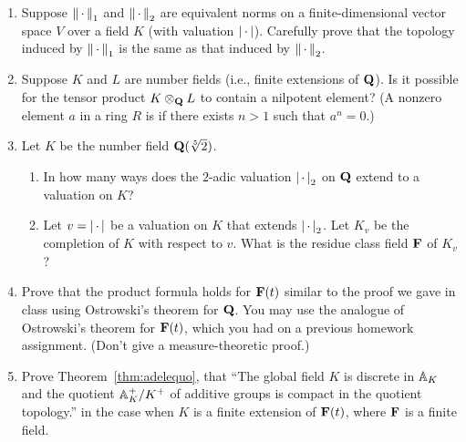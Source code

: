 \begin{enumerate}
\item Suppose $\normspc_1$ and $\normspc_2$ are 
equivalent norms on a finite-dimensional vector space
$V$ over a field $K$ (with valuation $\absspc$). 
Carefully prove that the topology induced by $\normspc_1$
is the same as that induced by $\normspc_2$.

\item Suppose $K$ and $L$ are number fields (i.e., finite
extensions of $\Q$).  Is it possible for the tensor
product $K\tensor_\Q L$ to contain a nilpotent element? 
(A nonzero element $a$ in a ring $R$ is  if 
there exists $n>1$ such that $a^n=0$.)

\item  Let $K$ be the number field $\Q(\sqrt[5]{2})$.

\begin{enumerate}
\item In how many ways does the $2$-adic valuation $\absspc_2$ on $\Q$
extend to a valuation on $K$?
\item Let $v=\absspc$ be a valuation on $K$ that extends $\absspc_2$.
Let $K_v$ be the completion of $K$ with respect to $v$.
What is the residue class field $\F$ of $K_v$?
\end{enumerate}

\item Prove that the product formula holds for $\F(t)$ similar to the
  proof we gave in class using Ostrowski's theorem for $\Q$.  You may
  use the analogue of Ostrowski's theorem for $\F(t)$, which you had
  on a previous homework assignment.  (Don't give a measure-theoretic
  proof.)
\item Prove Theorem~\ref{thm:adelequo}, that ``The global field $K$
  is discrete in $\AA_K$ and the quotient $\AA_K^+/K^+$ of additive
  groups is compact in the quotient topology.'' in the case when $K$
  is a finite extension of $\F(t)$, where $\F$ is a finite field.

\end{enumerate}


